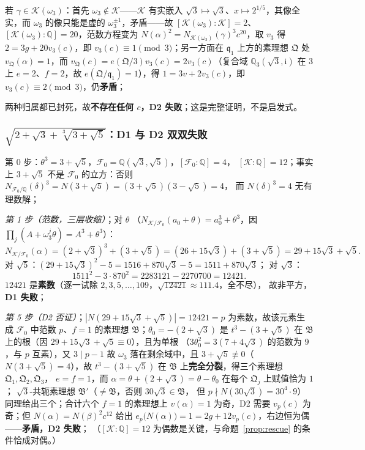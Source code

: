 \documentclass[UTF8,a4paper,11pt]{ctexart}
\newcommand{\ii}{\mathrm{i}}
\begin{document}
若 $\gamma\in\mathscr{K}(\omega_3)$：首先 $\omega_3\notin\mathscr{K}$——$\mathscr{K}$ 有实嵌入
$\sqrt3\mapsto\sqrt3$、$x\mapsto2^{1/5}$，其像全实，而 $\omega_3$ 的像只能是虚的
$\omega_3^{\pm1}$，矛盾——故 $[\mathscr{K}(\omega_3):\mathscr{K}]=2$、
$[\mathscr{K}(\omega_3):\mathbb{Q}]=20$，范数方程变为
$N(\alpha)^2=N_{\mathscr{K}(\omega_3)}(\gamma)^3c^{20}$，取 $v_3$ 得
$2=3g+20v_3(c)$，即 $v_3(c)\equiv1\pmod3$；另一方面在 $\mathfrak{q}_1$ 上方的素理想
$\mathfrak{Q}$ 处 $v_{\mathfrak{Q}}(\alpha)=1$，而
$v_{\mathfrak{Q}}(c)=e(\mathfrak{Q}/3)v_3(c)=2v_3(c)$（复合域 $\mathbb{Q}_3(\sqrt3,\ii)$ 在 $3$ 上
$e=2$、$f=2$，故 $e(\mathfrak{Q}/\mathfrak{q}_1)=1$），得
$1=3v+2v_3(c)$，即 $v_3(c)\equiv2\pmod3$，仍\textbf{矛盾}；\par

两种归属都已封死，故\textbf{不存在任何 $c$，D2 失败}；这是完整证明，不是启发式。\par

\subsubsection{$\sqrt{2+\sqrt3+\sqrt[3]{3+\sqrt5}}$：D1 与 D2 双双失败}
\label{ex:double-no-2}

第 0 步：$\theta^3=3+\sqrt5$，$\mathscr{F}_0=\mathbb{Q}(\sqrt3,\sqrt5)$，$[\mathscr{F}_0:\mathbb{Q}]=4$，
$[\mathscr{K}:\mathbb{Q}]=12$；事实上 $3+\sqrt5$ 不是 $\mathscr{F}_0$ 的立方：否则
$N_{\mathscr{F}_0/\mathbb{Q}}(\delta)^3=N(3+\sqrt5)=(3+\sqrt5)(3-\sqrt5)=4$，
而 $N(\delta)^3=4$ 无有理数解；\par

\emph{第 1 步（范数，三层收缩）}；对 $\theta$
（$N_{\mathscr{K}/\mathscr{F}_0}(a_0+\theta)=a_0^3+\theta^3$，因
$\prod_j(A+\omega_3^j\theta)=A^3+\theta^3$）：
\[
N_{\mathscr{K}/\mathscr{F}_0}(\alpha)=(2+\sqrt3)^3+(3+\sqrt5)=(26+15\sqrt3)+(3+\sqrt5)
=29+15\sqrt3+\sqrt5 .
\]
对 $\sqrt5$：$(29+15\sqrt3)^2-5=1516+870\sqrt3-5=1511+870\sqrt3$；
对 $\sqrt3$：
\[
1511^2-3\cdot870^2=2283121-2270700=12421 .
\]
$12421$ 是\textbf{素数}（逐一试除 $2,3,5,\dots,109$，$\sqrt{12421}\approx111.4$，全不尽），
故非平方，\textbf{D1 失败}；\par

\emph{第 5 步（D2 否证）}；$|N(29+15\sqrt3+\sqrt5)|=12421=p$ 为素数，故该元素生成
$\mathscr{F}_0$ 中范数 $p$、$f=1$ 的素理想 $\mathfrak{B}$；$\theta_0=-(2+\sqrt3)$ 是
$t^3-(3+\sqrt5)$ 在 $\mathfrak{B}$ 上的根（因 $29+15\sqrt3+\sqrt5\equiv0$），且为单根
（$3\theta_0^2=3(7+4\sqrt3)$ 的范数为 $9$，与 $p$ 互素），又 $3\mid p-1$ 故 $\omega_3$
落在剩余域中，且 $3+\sqrt5\not\equiv0$（$N(3+\sqrt5)=4$），故 $t^3-(3+\sqrt5)$ 在
$\mathfrak{B}$ 上\textbf{完全分裂}，得三个素理想 $\mathfrak{Q}_1,\mathfrak{Q}_2,\mathfrak{Q}_3$，
$e=f=1$，而 $\alpha=\theta+(2+\sqrt3)=\theta-\theta_0$ 在每个 $\mathfrak{Q}_j$ 上赋值恰为 $1$；
$\sqrt3$-共轭素理想 $\mathfrak{B}'$（$\ne\mathfrak{B}$，否则 $30\sqrt3\in\mathfrak{B}$，
但 $p\nmid N(30\sqrt3)=30^4\cdot9$）同理给出三个；合计六个 $f=1$ 的素理想上
$v(\alpha)=1$ 为奇，D2 需要 $v_p(c)$ 为奇；但 $N(\alpha)=N(\beta)^2c^{12}$ 给出
$e_p\bigl(N(\alpha)\bigr)=1=2g+12v_p(c)$，右边恒为偶——\textbf{矛盾，D2 失败}；
（$[\mathscr{K}:\mathbb{Q}]=12$ 为偶数是关键，与命题~\ref{prop:rescue} 的条件恰成对偶。）\par
\end{document}
